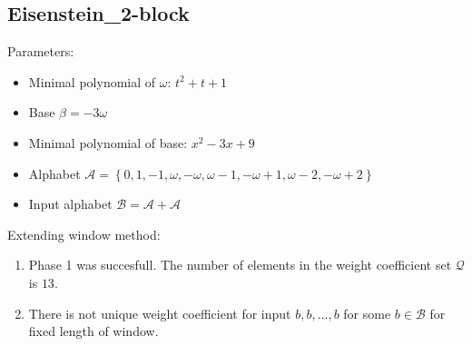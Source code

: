 \subsection{ Eisenstein\_2-block }

\label{subsec:Eisenstein2-block}

Parameters:
\begin{itemize}
    \item Minimal polynomial of $\omega$: $ t^{2} + t + 1 $
    \item Base $\beta= -3\omega $
    \item Minimal polynomial of base: $ x^{2} - 3x + 9 $
    \item Alphabet $\mathcal{A} =\left\{0, 1, -1, \omega, -\omega, \omega - 1, -\omega + 1, \omega - 2, -\omega + 2\right\}$
    \item Input alphabet $\mathcal{B} =\mathcal{A}+ \mathcal{A}$
\end{itemize}

\noindent Extending window method:
\begin{enumerate}
    \item Phase 1 was succesfull.
The number of elements in the weight coefficient set $\mathcal{Q}$ is $13$.

    \item There is not unique weight coefficient for input $b,b,\dots,b$ for some $b\in\mathcal{B}$ for fixed length of window.

\end{enumerate}

